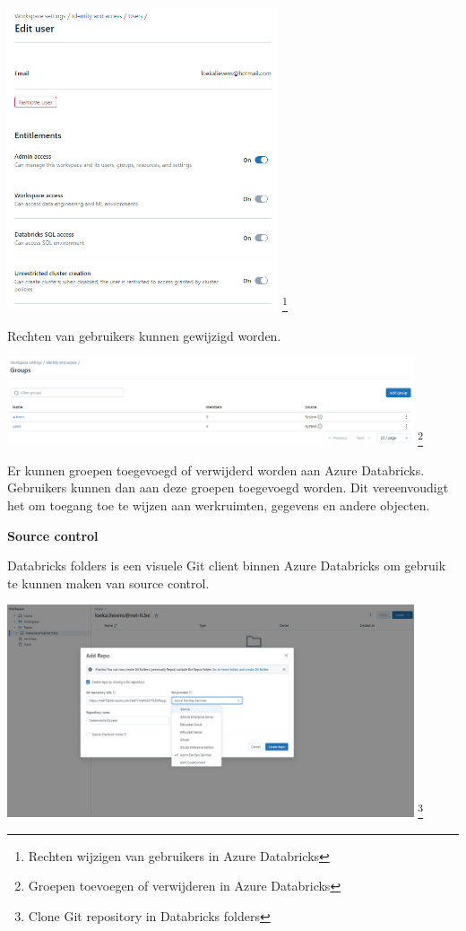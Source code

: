 \begin{center}
    \includegraphics[width=0.6\textwidth]{./graphics/databricks/management_permissions_2.png}
    \footnote{Rechten wijzigen van gebruikers in Azure Databricks}
\end{center}

Rechten van gebruikers kunnen gewijzigd worden.

\begin{center}
    \includegraphics[width=0.9\textwidth]{./graphics/databricks/management_permissions_3.png}
    \footnote{Groepen toevoegen of verwijderen in Azure Databricks}
\end{center}

Er kunnen groepen toegevoegd of verwijderd worden aan Azure Databricks. Gebruikers kunnen dan aan deze groepen toegevoegd worden. Dit vereenvoudigt het om toegang toe te wijzen aan werkruimten, gegevens en andere objecten.

\textbf{Source control}

Databricks folders is een visuele Git client binnen Azure Databricks om gebruik te kunnen maken van source control.

\begin{center}
    \includegraphics[width=0.9\textwidth]{./graphics/databricks/git_1.png}
    \footnote{Clone Git repository in Databricks folders}
\end{center}


